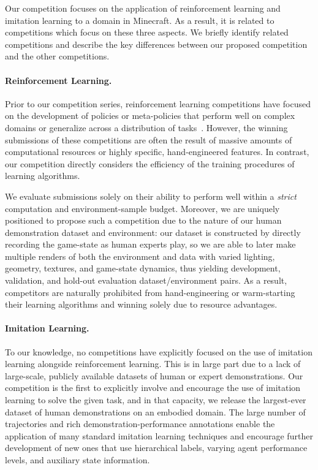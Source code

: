 Our competition focuses on the application of reinforcement learning and imitation learning to a domain in Minecraft. 
As a result, it is related to competitions which focus on these three aspects.
We briefly identify related competitions and describe the key differences between our proposed competition and the other competitions.

\paragraph{Reinforcement Learning.} Prior to our competition series, reinforcement learning competitions have focused on the development of policies or meta-policies that perform well on complex domains or generalize across a distribution of tasks~\cite{kidzinski2018learning, nichol2018gotta, perez2019multi}. 
However, the winning submissions of these competitions are often the result of massive amounts of computational resources or highly specific, hand-engineered features. 
In contrast, our competition directly considers the efficiency of the training procedures of learning algorithms.

We evaluate submissions solely on their ability to perform well within a \emph{strict} computation and environment-sample budget. 
Moreover, we are uniquely positioned to propose such a competition due to the nature of our human demonstration dataset and environment: our dataset is constructed by directly recording the game-state as human experts play, so we are able to later make multiple renders of both the environment and data with varied lighting, geometry, textures, and game-state dynamics, thus yielding development, validation, and hold-out evaluation dataset/environment pairs. 
As a result, competitors are naturally prohibited from hand-engineering or warm-starting their learning algorithms and winning solely due to resource advantages. 

\paragraph{Imitation Learning.} To our knowledge, no competitions have explicitly focused on the use of imitation learning alongside reinforcement learning. 
This is in large part due to a lack of large-scale, publicly available datasets of human or expert demonstrations. 
Our competition is the first to explicitly involve and encourage the use of imitation learning to solve the given task, and in that capacity, we release the largest-ever dataset of human demonstrations on an embodied domain.
The large number of trajectories and rich demonstration-performance annotations enable the application of many standard imitation learning techniques and encourage further development of new ones that use hierarchical labels, varying agent performance levels, and auxiliary state information.


